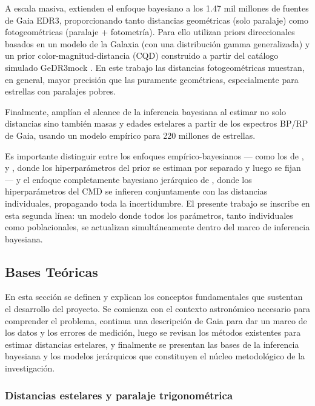 \documentclass[stu, 12pt, letterpaper, donotrepeattitle, floatsintext, natbib]{apa7_ula}
\begin{document}
A escala masiva, \citet{2021AJ....161..147B} extienden el enfoque
bayesiano a los 1.47 mil millones de fuentes de Gaia EDR3,
proporcionando tanto distancias geométricas (solo paralaje) como
fotogeométricas (paralaje + fotometría). Para ello utilizan priors
direccionales basados en un modelo de la Galaxia (con una distribución
gamma generalizada) y un prior color-magnitud-distancia (CQD)
construido a partir del catálogo simulado GeDR3mock
\citep{Rybizki_2020}. En este trabajo las distancias fotogeométricas muestran,
en general, mayor precisión que las puramente geométricas,
especialmente para estrellas con paralajes pobres.

Finalmente, \citet{Zhang_2023} amplían el alcance de la inferencia
bayesiana al estimar no solo distancias sino también masas y edades
estelares a partir de los espectros BP/RP de Gaia, usando un modelo
empírico para 220 millones de estrellas.

Es importante distinguir entre los enfoques empírico-bayesianos
--- como los de \citet{Anderson_2017}, \citet{2021AJ....161..147B}
y \citet{Zhang_2023}, donde los hiperparámetros del prior se
estiman por separado y luego se fijan --- y el enfoque completamente
bayesiano jerárquico de \citet{Leistedt_2017}, donde los
hiperparámetros del CMD se infieren conjuntamente con las
distancias individuales, propagando toda la incertidumbre.
El presente trabajo se inscribe en esta segunda línea: un modelo
donde todos los parámetros, tanto individuales como poblacionales,
se actualizan simultáneamente dentro del marco de inferencia
bayesiana.

\subsection{Bases Teóricas}

En esta sección se definen y explican los conceptos fundamentales
que sustentan el desarrollo del proyecto. Se comienza con el
contexto astronómico necesario para comprender el problema,
continua una descripción de Gaia para dar un marco de los datos
y los errores de medición, luego
se revisan los métodos existentes para estimar distancias estelares,
y finalmente se presentan las bases de la inferencia bayesiana y los
modelos jerárquicos que constituyen el núcleo metodológico de la
investigación.

\subsubsection{Distancias estelares y paralaje trigonométrica}
\end{document}
